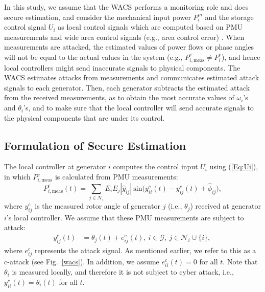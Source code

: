 In this study, we assume that the WACS performs a monitoring role and does secure estimation, and consider the mechanical input power $P_i^m$ and the storage control signal $U_i$ as local control signals which are computed based on PMU measurements and wide area control signals (e.g., area control error) \cite{Kundur}. When measurements are attacked, the estimated values of power flows or phase angles will not be equal to the actual values in the system (e.g., $P_{i,\text{meas}}^e \neq P_{i}^e$), and hence local controllers might send inaccurate signals to physical components. The WACS estimates attacks from measurements and communicates estimated attack signals to each generator. Then, each generator subtracts the estimated attack from the received measurements, as to obtain the most accurate values of $\omega_{i}$'s and $\theta_{i}$'s, and to make sure that the local controller will send accurate signals to the physical components that are under its control.




\vspace{-0.2cm}
\subsection{Formulation of Secure Estimation}

The local controller at generator $i$ computes the control input $U_i$ using (\ref{Eq:Ui}), in which $P_{i,\text{meas}}^e$ is calculated from PMU measurements:
\begin{equation}\label{eq:Pe_meas}
P_{i,\text{meas}}^e(t) = \sum_{j\in\mathcal{N}_i}{E_i E_j {|\widehat{y}_{ij}|} ~ \text{sin}\big(y^c_{ii}(t)-y^c_{ij}(t)+\widehat{\phi}_{ij}\big)},
\end{equation}
where $y^c_{ij}$ is the measured rotor angle of generator $j$ (i.e., $\theta_j$) received at generator $i$'s local controller. We assume that these PMU measurements are subject to attack:
\begin{equation}\label{Eq:yc}
\begin{aligned}
y^c_{ij}(t) & = \theta_j(t) + e^c_{ij} (t),~ i \in \mathcal{G},~j \in \mathcal{N}_i \cup \{i\}, \,
\end{aligned}
\end{equation}
where $e^c_{ij}$ represents the attack signal. As mentioned earlier, we refer to this as a c-attack (see Fig.~\ref{wacs}).
In addition, we assume $e^c_{ii}(t) = 0$ for all $t$. Note that $\theta_i$ is measured locally, and therefore it is not subject to cyber attack, i.e., $y^c_{ii}(t) = \theta_i(t)$ for all $t$.

